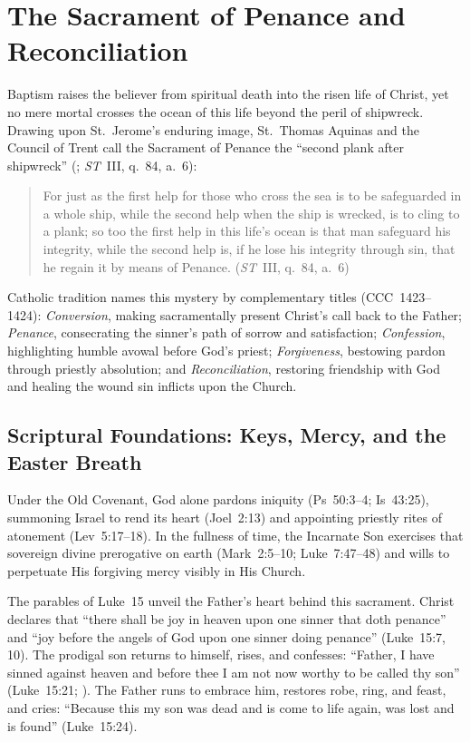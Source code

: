 \section{The Sacrament of Penance and Reconciliation}
\label{sec:penance}

Baptism raises the believer from spiritual death into the risen life of Christ, yet no mere mortal crosses the ocean of this life beyond the peril of shipwreck. Drawing upon St.~Jerome's enduring image, St.~Thomas Aquinas and the Council of Trent call the Sacrament of Penance the ``second plank after shipwreck'' (; \emph{ST}~III, q.~84, a.~6):
\begin{quotation}
For just as the first help for those who cross the sea is to be safeguarded in a whole ship, while the second help when the ship is wrecked, is to cling to a plank; so too the first help in this life's ocean is that man safeguard his integrity, while the second help is, if he lose his integrity through sin, that he regain it by means of Penance. (\emph{ST}~III, q.~84, a.~6)
\end{quotation}
Catholic tradition names this mystery by complementary titles (CCC~1423--1424): \emph{Conversion}, making sacramentally present Christ's call back to the Father; \emph{Penance}, consecrating the sinner's path of sorrow and satisfaction; \emph{Confession}, highlighting humble avowal before God's priest; \emph{Forgiveness}, bestowing pardon through priestly absolution; and \emph{Reconciliation}, restoring friendship with God and healing the wound sin inflicts upon the Church.

\subsection{Scriptural Foundations: Keys, Mercy, and the Easter Breath}
\label{subsec:penance-scripture}

Under the Old Covenant, God alone pardons iniquity (Ps~50:3--4; Is~43:25), summoning Israel to rend its heart (Joel~2:13) and appointing priestly rites of atonement (Lev~5:17--18). In the fullness of time, the Incarnate Son exercises that sovereign divine prerogative on earth (Mark~2:5--10; Luke~7:47--48) and wills to perpetuate His forgiving mercy visibly in His Church.

The parables of Luke~15 unveil the Father's heart behind this sacrament. Christ declares that ``there shall be joy in heaven upon one sinner that doth penance'' and ``joy before the angels of God upon one sinner doing penance'' (Luke~15:7, 10). The prodigal son returns to himself, rises, and confesses: ``Father, I have sinned against heaven and before thee I am not now worthy to be called thy son'' (Luke~15:21; ). The Father runs to embrace him, restores robe, ring, and feast, and cries: ``Because this my son was dead and is come to life again, was lost and is found'' (Luke~15:24).

